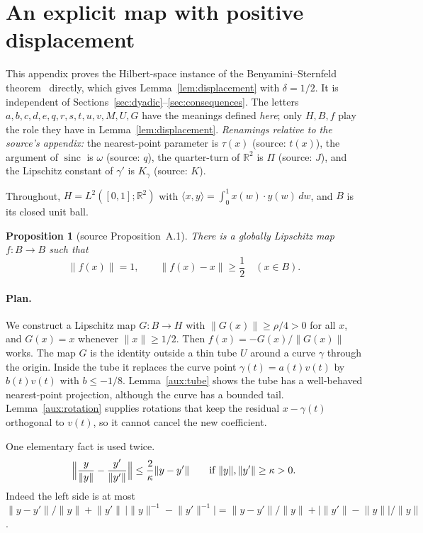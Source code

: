 \documentclass[11pt]{article}
\newcommand{\R}{\mathbb R}
\newcommand{\norm}[1]{\lVert #1\rVert}
\newcommand{\ip}[2]{\langle #1,#2\rangle}
\DeclareMathOperator{\sinc}{sinc}
\newtheorem{proposition}[theorem]{Proposition}
\theoremstyle{definition}
\numberwithin{equation}{section}
\begin{document}
\appendix
\section{An explicit map with positive displacement}\label{app:auxiliary}

This appendix proves the Hilbert-space instance of the
Benyamini--Sternfeld theorem~\cite{BenyaminiSternfeld1983} directly, which
gives Lemma~\ref{lem:displacement} with \(\delta=1/2\). It is independent
of Sections~\ref{sec:dyadic}--\ref{sec:consequences}. The letters
\(a,b,c,d,e,q,r,s,t,u,v,M,U,G\) have the meanings defined \emph{here};
only \(H,B,f\) play the role they have in Lemma~\ref{lem:displacement}.
\emph{Renamings relative to the source's appendix:} the nearest-point
parameter is \(\tau(x)\) (source: \(t(x)\)), the argument of \(\sinc\) is
\(\omega\) (source: \(q\)), the quarter-turn of \(\R^2\) is \(\Pi\)
(source: \(J\)), and the Lipschitz constant of \(\gamma'\) is
\(K_\gamma\) (source: \(K\)).

Throughout, \(H=L^2([0,1];\R^2)\) with
\(\ip xy=\int_0^1x(w)\cdot y(w)\,dw\), and \(B\) is its closed unit ball.

\begin{proposition}[source Proposition~A.1]\label{aux:map}
There is a globally Lipschitz map \(f:B\to B\) such that
\[
  \norm{f(x)}=1,
  \qquad \norm{f(x)-x}\ge\frac12
  \quad(x\in B).
\]
\end{proposition}

\paragraph{Plan.} We construct a Lipschitz map \(G:B\to H\) with
\(\norm{G(x)}\ge\rho/4>0\) for all \(x\), and \(G(x)=x\) whenever
\(\norm x\ge1/2\). Then \(f(x)=-G(x)/\norm{G(x)}\) works. The map \(G\) is
the identity outside a thin tube \(U\) around a curve \(\gamma\) through
the origin. Inside the tube it replaces the curve point
\(\gamma(t)=a(t)v(t)\) by \(b(t)v(t)\) with \(b\le-1/8\).
Lemma~\ref{aux:tube} shows the tube has a well-behaved nearest-point
projection, although the curve has a bounded tail.
Lemma~\ref{aux:rotation} supplies rotations that keep the residual
\(x-\gamma(t)\) orthogonal to \(v(t)\), so it cannot cancel the new
coefficient.

One elementary fact is used twice.
\begin{equation}\label{aux:normalize}
  \Bigl\|\frac{y}{\norm y}-\frac{y'}{\norm{y'}}\Bigr\|
  \le\frac{2}{\kappa}\norm{y-y'}
  \qquad\text{if }\norm y,\norm{y'}\ge\kappa>0 .
\end{equation}
Indeed the left side is at most
\(\norm{y-y'}/\norm y+\norm{y'}\,\bigl|\norm{y}^{-1}-\norm{y'}^{-1}\bigr|
=\norm{y-y'}/\norm y+\bigl|\norm{y'}-\norm y\bigr|/\norm y\).
\end{document}
